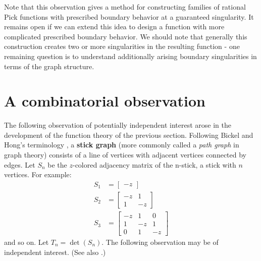\documentclass[12pt]{amsart}
\theoremstyle{remark}
\numberwithin{equation}{section}
\newcommand{\dfn}[1]{{\bf #1}\index{#1}}
\begin{document}

Note that this observation gives a method for constructing families of rational Pick functions with prescribed boundary behavior at a guaranteed singularity. It remains open if we can extend this idea to design a function with more complicated prescribed boundary behavior. We should note that generally this construction creates two or more singularities in the resulting function - one remaining question is to understand additionally arising boundary singularities in terms of the graph structure.


\section{A combinatorial observation}
The following observation of potentially independent interest arose in the development of the function theory of the previous section. Following Bickel and Hong's terminology \cite{hong}, a \dfn{stick graph} (more commonly called  a \textit{path graph} in graph theory)  consists of a line of vertices with adjacent vertices connected by edges. Let $S_n$ be the $z$-colored adjacency matrix of the n-stick, a stick with $n$ vertices. For example:
    \begin{align*}
        S_1 &= \begin{bmatrix}
            -z
        \end{bmatrix} \\
        S_2 &= \begin{bmatrix}
            -z & 1 \\ 1 & -z
        \end{bmatrix} \\
        S_3 &= \begin{bmatrix}
            -z & 1 & 0 \\ 1 & -z & 1 \\ 0 & 1 & -z
        \end{bmatrix}
    \end{align*}
    and so on.
    Let $T_n = \det(S_n)$. The following observation may be of independent interest. (See also \cite[Section 3.1]{rahm}.)
\end{document}
